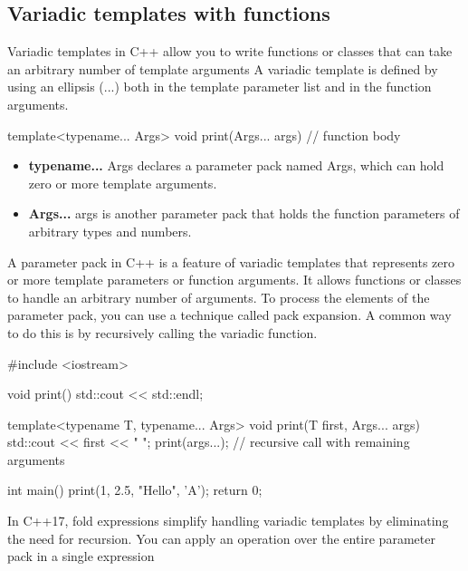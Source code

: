 \documentclass{report}
\begin{document}
     \subsection{Variadic templates with functions}
     \bigbreak \noindent 
     Variadic templates in C++ allow you to write functions or classes that can take an arbitrary number of template arguments
     \bigbreak \noindent 
     A variadic template is defined by using an ellipsis (...) both in the template parameter list and in the function arguments. 
     \bigbreak \noindent 
     \begin{cppcode}
         template<typename... Args>
         void print(Args... args) {
             // function body
         }
     \end{cppcode}
     \bigbreak \noindent 
     \begin{itemize}
         \item \textbf{typename...} Args declares a parameter pack named Args, which can hold zero or more template arguments.
         \item \textbf{Args...} args is another parameter pack that holds the function parameters of arbitrary types and numbers.
     \end{itemize}
     \bigbreak \noindent 
     A parameter pack in C++ is a feature of variadic templates that represents zero or more template parameters or function arguments. It allows functions or classes to handle an arbitrary number of arguments.
     \bigbreak \noindent 
     To process the elements of the parameter pack, you can use a technique called pack expansion. A common way to do this is by recursively calling the variadic function. 
     \bigbreak \noindent 
     \begin{cppcode}
         #include <iostream>

         void print() {
             std::cout << std::endl;
         }

         template<typename T, typename... Args>
         void print(T first, Args... args) {
             std::cout << first << " ";
             print(args...);  // recursive call with remaining arguments
         }

         int main() {
             print(1, 2.5, "Hello", 'A');
             return 0;
        }
     \end{cppcode}
     \bigbreak \noindent 
     In C++17, fold expressions simplify handling variadic templates by eliminating the need for recursion. You can apply an operation over the entire parameter pack in a single expression
     \bigbreak \noindent 
\end{document}

